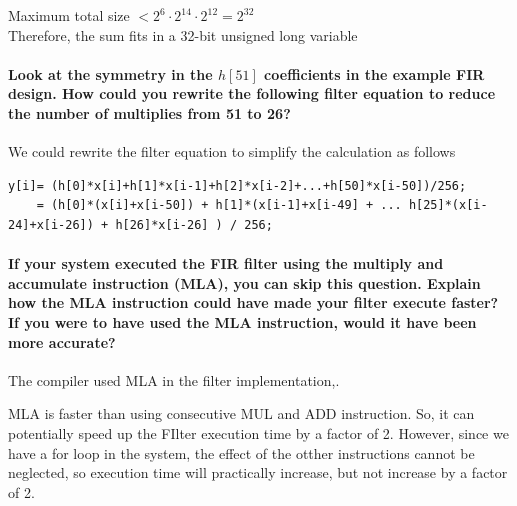 \documentclass[a4paper]{article}
\begin{document}
 Maximum total size $ < 2^6 \cdot 2^14 \cdot 2^12 = 2 ^ 32 $ \\
 Therefore, the sum fits in a 32-bit unsigned long variable \\
 
\paragraph{Look at the symmetry in the $h[51]$ coefficients in the example FIR design. How could you rewrite the 
following filter equation to reduce the number of multiplies from 51 to 26? \\}

We could rewrite the filter equation to simplify the calculation as follows
{ \lstset{language=C, frame=none, numbers=none}
\begin{lstlisting}
y[i]= (h[0]*x[i]+h[1]*x[i-1]+h[2]*x[i-2]+...+h[50]*x[i-50])/256;
    = (h[0]*(x[i]+x[i-50]) + h[1]*(x[i-1]+x[i-49] + ... h[25]*(x[i-24]+x[i-26]) + h[26]*x[i-26] ) / 256;
\end{lstlisting}
}

\paragraph{If your system executed the FIR filter using the multiply and accumulate instruction (MLA), you can skip 
this question. Explain how the MLA instruction could have made your filter execute faster? If you were to have 
used the MLA instruction, would it have been more accurate? \\}

The compiler used MLA in the filter implementation,.

MLA is faster than using consecutive MUL and ADD instruction. So, it can potentially speed up the FIlter execution time by a factor of 2. However, since we have a for loop in the system, the effect of the otther instructions cannot be neglected, so execution time will practically increase, but not increase by a factor of 2.
\end{document}
